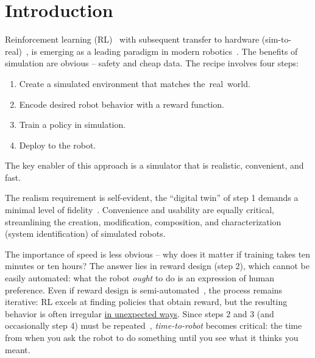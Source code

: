 \section{Introduction}

Reinforcement learning (RL)~\cite{kober2013reinforcement} with subsequent transfer to hardware (sim-to-real)~\cite{zhao2020sim}, is emerging as a leading paradigm in modern robotics~\cite{kaufmann2023champion, lee2019robust, miki2022learning}. The benefits of simulation are obvious -- safety and cheap data. The recipe involves four steps:
\begin{enumerate}[leftmargin=0.8cm, rightmargin=0.4cm, topsep=0em, itemsep=2pt] 
    \item Create a simulated environment that matches the~real~world.
    \item Encode desired robot behavior with a reward function.
    \item Train a policy in simulation.
    \item Deploy to the robot. 
\end{enumerate}

The key enabler of this approach is a simulator that is realistic, convenient, and fast. 

The realism requirement is self-evident, the ``digital twin'' of step 1 demands a minimal level of fidelity~\cite{zhao2020sim}. Convenience and usability are equally critical, streamlining the creation, modification, composition, and characterization (system identification) of simulated robots.

The importance of speed is less obvious -- why does it matter if training takes ten minutes or ten hours? The answer lies in reward design (step 2), which cannot be easily automated: what the robot \emph{ought} to do is an expression of human preference. Even if reward design is semi-automated~\cite{ma2023eureka}, the process remains iterative: RL excels at finding policies that obtain reward, but the resulting behavior is often irregular \href{https://www.youtube.com/watch?v=EI3gcbDUNiM&t=257s}{in unexpected ways}.
Since steps 2 and 3 (and occasionally step 4) must be repeated~\cite{chebotar2019closing}, \mbox{\emph{time-to-robot}} becomes critical: the time from when you ask the robot to do something until you see what it thinks you meant.

